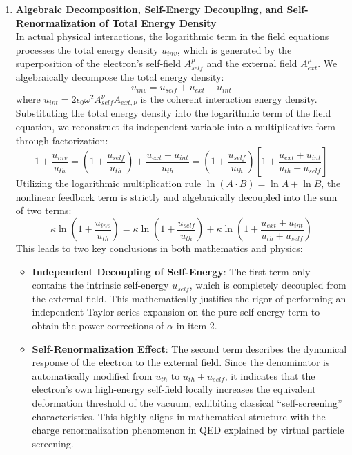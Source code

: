 \documentclass[12pt, a4paper]{article}
\begin{document}
\begin{enumerate}
    \item \textbf{Algebraic Decomposition, Self-Energy Decoupling, and Self-Renormalization of Total Energy Density} \\
    In actual physical interactions, the logarithmic term in the field equations processes the total energy density $u_{inv}$, which is generated by the superposition of the electron's self-field $A_{self}^\mu$ and the external field $A_{ext}^\mu$. We algebraically decompose the total energy density:
    \begin{equation}
    u_{inv} = u_{self} + u_{ext} + u_{int}
    \end{equation}
    where $u_{int} = 2\epsilon_0 \omega^2 A_{self}^\nu A_{ext,\nu}$ is the coherent interaction energy density. Substituting the total energy density into the logarithmic term of the field equation, we reconstruct its independent variable into a multiplicative form through factorization:
    \begin{equation}
    1 + \frac{u_{inv}}{u_{th}} = \left( 1 + \frac{u_{self}}{u_{th}} \right) + \frac{u_{ext} + u_{int}}{u_{th}} = \left( 1 + \frac{u_{self}}{u_{th}} \right) \left[ 1 + \frac{u_{ext} + u_{int}}{u_{th} + u_{self}} \right]
    \end{equation}
    Utilizing the logarithmic multiplication rule $\ln(A \cdot B) = \ln A + \ln B$, the nonlinear feedback term is strictly and algebraically decoupled into the sum of two terms:
    \begin{equation}
    \kappa \ln\left(1 + \frac{u_{inv}}{u_{th}}\right) = \kappa \ln\left(1 + \frac{u_{self}}{u_{th}}\right) + \kappa \ln\left(1 + \frac{u_{ext} + u_{int}}{u_{th} + u_{self}}\right)
    \end{equation}
    This leads to two key conclusions in both mathematics and physics:
    \begin{itemize}
        \item \textbf{Independent Decoupling of Self-Energy}: The first term only contains the intrinsic self-energy $u_{self}$, which is completely decoupled from the external field. This mathematically justifies the rigor of performing an independent Taylor series expansion on the pure self-energy term to obtain the power corrections of $\alpha$ in item 2.
        \item \textbf{Self-Renormalization Effect}: The second term describes the dynamical response of the electron to the external field. Since the denominator is automatically modified from $u_{th}$ to $u_{th} + u_{self}$, it indicates that the electron's own high-energy self-field locally increases the equivalent deformation threshold of the vacuum, exhibiting classical ``self-screening'' characteristics. This highly aligns in mathematical structure with the charge renormalization phenomenon in QED explained by virtual particle screening.
    \end{itemize}
\end{enumerate}
\end{document}
